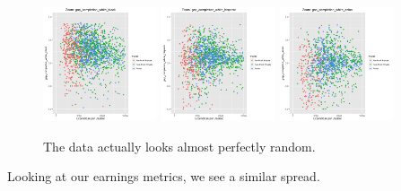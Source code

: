\documentclass{article}
\begin{document}
\begin{figure}[H]
\centering
\includegraphics[width=0.3\textwidth]{../images/eda_scatterplots/gap_completion_white_black_zoom.png}
\includegraphics[width=0.3\textwidth]{../images/eda_scatterplots/gap_completion_white_hispanic_zoom.png}
\includegraphics[width=0.3\textwidth]{../images/eda_scatterplots/gap_completion_white_asian_zoom.png}
\caption{\label{fig:ZoomCompletionRates} The data actually looks almost perfectly random.}
\end{figure}

Looking at our earnings metrics, we see a similar spread.
\end{document}

